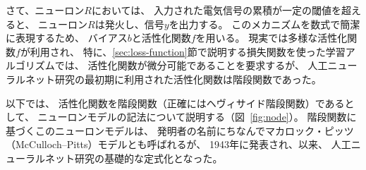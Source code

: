 さて、ニューロン$R$においては、
入力された電気信号の累積が一定の閾値を超えると、
ニューロン$R$は発火し、信号$y$を出力する。
このメカニズムを数式で簡潔に表現するため、
バイアス$b$と活性化関数$f$を用いる。
現実では多様な活性化関数$f$が利用され、
特に、\ref{sec:loss-function}節で説明する損失関数を使った学習アルゴリズムでは、
活性化関数が微分可能であることを要求するが、
人工ニューラルネット研究の最初期に利用された活性化関数は階段関数であった。

以下では、
活性化関数を階段関数（正確にはヘヴィサイド階段関数）であるとして、
ニューロンモデルの記法について説明する（図~\ref{fig:node}）。
階段関数に基づくこのニューロンモデルは、
発明者の名前にちなんでマカロック・ピッツ（McCulloch–Pitts）モデルとも呼ばれるが、
1943年に発表され、以来、
人工ニューラルネット研究の基礎的な定式化となった。



